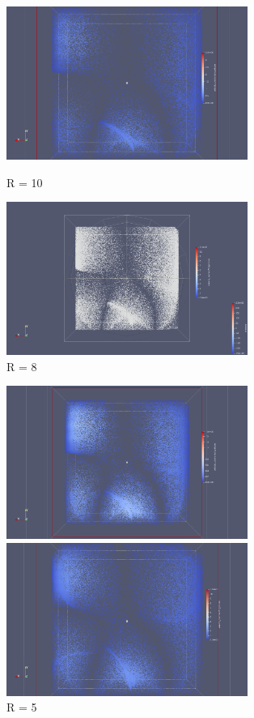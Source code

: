 \documentclass[a4paper,12pt,titlepage]{report}
\begin{document}
\begin{onehalfspace}
\begin{figure}[!h]
\begin{minipage}[c]{.46\linewidth}
        \includegraphics[height = 5cm, keepaspectratio]{graphes/Paraview/section_pioncarre_R_10.png}
        \caption{R = 10}
    \end{minipage}
    \hfill%
    \begin{minipage}[c]{.46\linewidth}
        \centering
        \includegraphics[height = 5cm, keepaspectratio]{graphes/Paraview/section_pioncarre_R_8_maillage_double.png}
        \caption{R = 8}
    \end{minipage}
\end{figure}
\begin{figure}[!h]
    \begin{minipage}[c]{.46\linewidth}
        \centering
        \includegraphics[height = 5cm, keepaspectratio]{graphes/Paraview/section_pioncarre_R_5.png}
        \caption{R = 5}
    \end{minipage}
    \hfill%
    \begin{minipage}[c]{.46\linewidth}
        \centering
        \includegraphics[height = 5cm, keepaspectratio]{graphes/Paraview/section_pioncarre_R_2_double.png}

\end{minipage}
\end{figure}
\end{onehalfspace}
\end{document}
